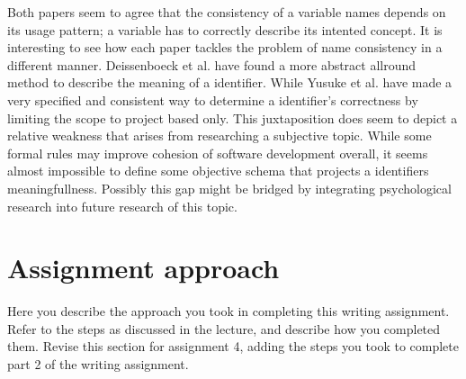 \documentclass[a4paper,12pt]{article}
\begin{document}
Both papers seem to agree that the consistency of a variable names depends on its usage pattern; a variable has to correctly describe its intented concept. It is interesting to see how each paper tackles the problem of name consistency in a different manner. Deissenboeck et al. have found a more abstract allround method to describe the meaning of a identifier. While Yusuke et al. have made a very specified and consistent way to determine a identifier's correctness by limiting the scope to project based only. This juxtaposition does seem to depict a relative weakness that arises from researching a subjective topic. While some formal rules may improve cohesion of software development overall, it seems almost impossible to define some objective schema that projects a identifiers meaningfullness. Possibly this gap might be bridged by integrating psychological research into future research of this topic.




\section{Assignment approach}
Here you describe the approach you took in completing this writing assignment. Refer to the steps as discussed in the lecture, and describe how you completed them. Revise this section for assignment 4, adding the steps you took to complete part 2 of the writing assignment. 



\end{document}
